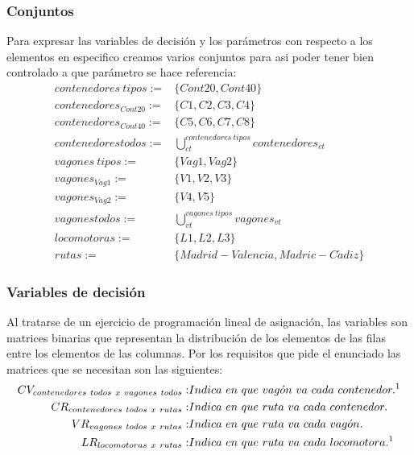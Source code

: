 \documentclass[11pt,spanish]{article}
\begin{document}
			\subsubsection{Conjuntos}
			Para expresar las variables de decisión y los parámetros con respecto a los elementos en especifico creamos varios conjuntos para asi poder tener bien controlado a que parámetro se hace referencia:
			\begin{align*}
				contenedores\ tipos :=& \{ Cont20, Cont40 \} \\
				contenedores_{Cont20} :=& \{ C1, C2, C3, C4 \} \\
				contenedores_{Cont40} :=& \{ C5, C6, C7, C8 \} \\
				contenedores todos :=& \bigcup_{ct}^{contenedores\ tipos} contenedores_{ct} \\
				vagones\ tipos :=& \{ Vag1, Vag2 \} \\
				vagones_{Vag1} :=& \{ V1, V2, V3 \} \\
				vagones_{Vag2} :=& \{ V4, V5 \} \\
				vagones todos :=& \bigcup_{vt}^{vagones\ tipos} vagones_{vt} \\
				locomotoras :=& \{ L1, L2, L3 \} \\
				rutas :=& \{ Madrid-Valencia, Madric-C\acute{a}diz \}
			\end{align*}
			\subsubsection{Variables de decisión}
			Al tratarse de un ejercicio de programación lineal de asignación, las variables son matrices binarias que representan la distribución de los elementos de las filas entre los elementos de las columnas. Por los requisitos que pide el enunciado las matrices que se necesitan son las siguientes:
			\begin{align*}
				CV_{contenedores\ todos\ x\ vagones\ todos} :& Indica\ en\ que\ vag\acute{o}n\ va\ cada\ contenedor.\text{\footnotemark} \\
				CR_{contenedores\ todos\ x\ rutas} :& Indica\ en\ que\ ruta\ va\ cada\ contenedor.\\
				VR_{vagones\ todos\ x\ rutas} :& Indica\ en\ que\ ruta\ va\ cada\ vag\acute{o}n.\\
				LR_{locomotoras\ x\ rutas} :& Indica\ en\ que\ ruta\ va\ cada\ locomotora.^1
			\end{align*}
\end{document}
